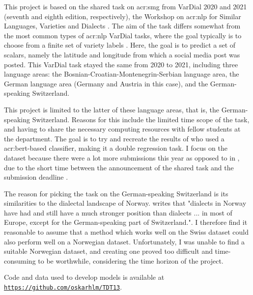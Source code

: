 \begin{comment}
The introduction can also briefly describe what methodology you will apply to reach the goal and the reasons for this choice of research methodology.
It can furthermore provide a brief summary of the main contributions of the work,
and should provide the reader with an overview of what is coming in the next sections.
You want to say more than what is explicit in the section names, if possible, but still keep the description short and to the point.
\end{comment}

This project is based on the shared task on \gls{acr:smg} from VarDial 2020 and 2021 (seventh and eighth edition, respectively), the Workshop on \gls{acr:nlp} for Similar Languages, Varieties and Dialects \citep{gamanReportVarDialEvaluation2020, chakravarthiFindingsVarDialEvaluation2021}. The aim of the task differs somewhat from the most common types of \gls{acr:nlp} VarDial tasks, where the goal typically is to choose from a finite set of variety labels \citep[1]{scherrerSocialMediaVariety2021}. Here, the goal is to predict a set of scalars, namely the latitude and longitude from which a social media post was posted. This VarDial task stayed the same from 2020 to 2021, including three language areas: the Bosnian-Croatian-Montenegrin-Serbian language area, the German language area (Germany and Austria in this case), and the German-speaking Switzerland.

This project is limited to the latter of these language areas, that is, the German-speaking Switzerland. Reasons for this include the limited time scope of the task, and having to share the necessary computing resources with fellow students at the department. The goal is to try and recreate the results of \cite{scherrerHeLjuVarDial20202020} who used a \acrshort{acr:bert}-based classifier, making it a double regression task. I focus on the \citeyear{scherrerHeLjuVarDial20202020} dataset because there were a lot more submissions this year as opposed to in \citeyear{scherrerSocialMediaVariety2021}, due to the short time between the announcement of the shared task and the submission deadline \citep[6]{chakravarthiFindingsVarDialEvaluation2021}.

The reason for picking the task on the German-speaking Switzerland is its similarities to the dialectal landscape of Norway. \cite[14]{roynelandDialectsNorwayCatching2009} writes that "dialects in Norway have had and still have a much stronger position than dialects ... in most of Europe, except for the German-speaking part of Switzerland.". I therefore find it reasonable to assume that a method which works well on the Swiss dataset could also perform well on a Norwegian dataset. Unfortunately, I was unable to find a suitable Norwegian dataset, and creating one proved too difficult and time-consuming to be worthwhile, considering the time horizon of the project.

Code and data used to develop models is available at \texttt{\url{https://github.com/oskarhlm/TDT13}}.